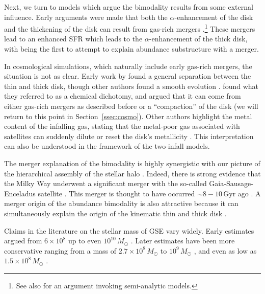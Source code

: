 \documentclass[twocolumn,linenumbers,trackchanges]{aastex631}
\newcommand{\Msun}{\ensuremath{M_{\odot}}}
\newcommand{\Gyr}{\ensuremath{\textrm{Gyr}}}
\begin{document}
Next, we turn to models which argue the bimodality results from some external influence. Early arguments were made that both the $\alpha$-enhancement of the disk and the thickening of the disk can result from gas-rich mergers \citep{2004ApJ...612..894B,2005ApJ...630..298B,2007ApJ...658...60B,2010MNRAS.402.1489R}.\footnote{See also \citet{2009MNRAS.400.1347C} for an argument invoking semi-analytic models.} These mergers lead to an enhanced SFR which leads to the $\alpha$-enhancement of the thick disk, with \citet{2015A&A...578A..87S} being the first to attempt to explain abundance substructure with a merger.

In cosmological simulations, which naturally include early gas-rich mergers, the situation is not as clear. Early work by \citet{2012MNRAS.426..690B} found a general separation between the thin and thick disk, though other authors found a smooth evolution \citep{2013A&A...558A...9M}. \citet{2018MNRAS.474.3629G} found what they referred to as a chemical dichotomy, and argued that it can come from either gas-rich mergers as described before or a ``compaction'' of the disk (we will return to this point in Section~\ref{ssec:cosmo}). Other authors highlight the metal content of the infalling gas, stating that the metal-poor gas associated with satellites can suddenly dilute or reset the disk's metallicity \citep{2020MNRAS.491.5435B,2024MNRAS.528L.122C}. This interpretation can also be understood in the framework of the two-infall models.

The merger explanation of the bimodality is highly synergistic with our picture of the hierarchical assembly of the stellar halo \citep{2005ApJ...635..931B}. Indeed, there is strong evidence that the Milky Way underwent a significant merger with the so-called Gaia-Sausage-Enceladus satellite \citep[GSE;][]{2018MNRAS.478..611B,2018Natur.563...85H,2020ApJ...901...48N}. This merger is thought to have occurred $\sim8-10\,\Gyr$ ago \citep[see also][]{2020ApJ...897L..18B}. A merger origin of the abundance bimodality is also attractive because it can simultaneously explain the origin of the kinematic thin and thick disk \citep{1985AJ.....90.2015G,1986ApJ...309..472Q,1993ApJ...403...74Q}.

Claims in the literature on the stellar mass of GSE vary widely. Early estimates argued from $6\times10^8$ up to even $10^{10}\,\Msun$ \citep{2018MNRAS.478..611B,2018Natur.563...85H,2019MNRAS.484.4471F,2019MNRAS.487L..47V,2019MNRAS.488.1235M,2020MNRAS.493.5195D,2020MNRAS.497..109F}. Later estimates have been more conservative ranging from a mass of $2.7\times10^8\,\Msun$ to $10^9\,\Msun$ \citep{2019MNRAS.482.3426M,2020MNRAS.492.3631M,2020MNRAS.498.2472K,2021ApJ...923...92N,2022AJ....164..249H}, and even as low as $1.5\times10^8\,\Msun$ \citep{2023MNRAS.526.1209L}.
\end{document}
